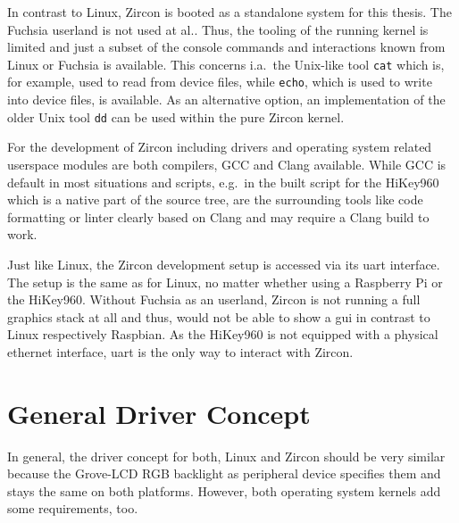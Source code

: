 In contrast to Linux, Zircon is booted as a standalone system for this thesis.
The Fuchsia userland is not used at al..
Thus, the tooling of the running kernel is limited and just a subset of the console commands and interactions known from Linux or Fuchsia is available.
This concerns i.a.\ the Unix-like tool \texttt{cat} which is, for example, used to read from device files, while \texttt{echo}, which is used to write into device files, is available.
As an alternative option, an implementation of the older Unix tool \texttt{dd} can be used within the pure Zircon kernel.

For the development of Zircon including drivers and operating system related userspace modules are both compilers, GCC and Clang available.
While GCC is default in most situations and scripts, e.g.\ in the built script for the HiKey960 which is a native part of the source tree, are the surrounding tools like code formatting or linter clearly based on Clang and may require a Clang build to work.

Just like Linux, the Zircon development setup is accessed via its \ac{uart} interface.
The setup is the same as for Linux, no matter whether using a Raspberry Pi or the HiKey960.
Without Fuchsia as an userland, Zircon is not running a full graphics stack at all and thus, would not be able to show a \ac{gui} in contrast to Linux respectively Raspbian.
As the HiKey960 is not equipped with a physical ethernet interface, \ac{uart} is the only way to interact with Zircon.

  
\section{General Driver Concept}\label{sec:cs-driver-concept}
In general, the driver concept for both, Linux and Zircon should be very similar because the Grove-LCD RGB backlight as peripheral device specifies them and stays the same on both platforms.
However, both operating system kernels add some requirements, too.


